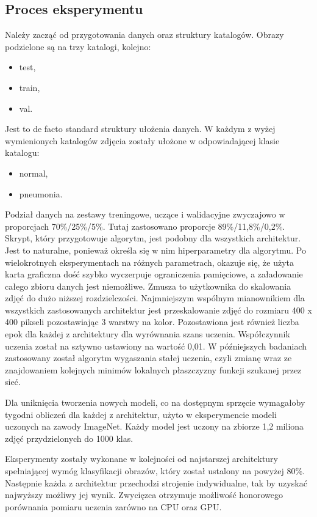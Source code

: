 \documentclass[12pt,a4paper,twoside,titlepage,openright]{book}
\begin{document}
\begin{itemize}
\begin{itemize}
\section{Proces eksperymentu}
Należy zacząć od przygotowania danych oraz struktury katalogów. Obrazy podzielone są na trzy katalogi, kolejno:
\begin{itemize}
\item test,
\item train,
\item val.
\end{itemize}

Jest to de facto standard struktury ułożenia danych. W każdym z wyżej wymienionych katalogów zdjęcia zostały ułożone w odpowiadającej klasie katalogu:
\begin{itemize}
\item normal,
\item pneumonia.
\end{itemize}

Podział danych na zestawy treningowe, uczące i walidacyjne zwyczajowo w proporcjach 70\%/25\%/5\%. Tutaj zastosowano proporcje 89\%/11,8\%/0,2\%.
Skrypt, który przygotowuje algorytm, jest podobny dla wszystkich architektur. Jest to naturalne, ponieważ określa się w nim hiperparametry dla algorytmu. Po wielokrotnych eksperymentach na różnych parametrach, okazuje się, że użyta karta graficzna dość szybko wyczerpuje ograniczenia pamięciowe, a załadowanie całego zbioru danych jest niemożliwe. Zmusza to użytkownika do skalowania zdjęć do dużo niższej rozdzielczości. Najmniejszym wspólnym mianownikiem dla wszystkich zastosowanych architektur jest przeskalowanie zdjęć do rozmiaru 400 x 400 pikseli pozostawiając 3 warstwy na kolor. Pozostawiona jest również liczba epok dla każdej z architektury dla wyrównania szans uczenia. Współczynnik uczenia został na sztywno ustawiony na wartość 0,01. W późniejszych badaniach zastosowany został algorytm wygaszania stałej uczenia, czyli zmianę wraz ze znajdowaniem kolejnych minimów lokalnych płaszczyzny funkcji szukanej przez sieć.

Dla uniknięcia tworzenia nowych modeli, co na dostępnym sprzęcie wymagałoby tygodni obliczeń dla każdej z architektur, użyto w eksperymencie modeli uczonych na zawody ImageNet. Każdy model jest uczony na zbiorze 1,2 miliona zdjęć przydzielonych do 1000 klas.

Eksperymenty zostały wykonane w kolejności od najstarszej architektury spełniającej wymóg klasyfikacji obrazów, który został ustalony na powyżej 80\%. Następnie każda z architektur przechodzi strojenie indywidualne, tak by uzyskać najwyższy możliwy jej wynik. Zwycięzca otrzymuje możliwość honorowego porównania pomiaru uczenia zarówno na CPU oraz GPU.


\end{itemize}
\end{itemize}
\end{document}
